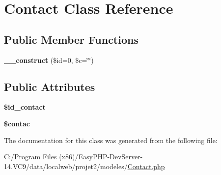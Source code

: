 \hypertarget{class_contact}{}\section{Contact Class Reference}
\label{class_contact}
\subsection*{Public Member Functions}
\begin{DoxyCompactItemize}
\item 
\mbox{\label{class_contact_a3c5a2b70d09ac36be451b4d5d6027810}} 
{\bfseries \+\_\+\+\_\+construct} (\$id=0, \$c=\char`\"{}\char`\"{})
\end{DoxyCompactItemize}
\subsection*{Public Attributes}
\begin{DoxyCompactItemize}
\item 
\mbox{\label{class_contact_a9fbfc98fad7d32a96af92c9b6cfcd5f0}} 
{\bfseries \$id\+\_\+contact}
\item 
\mbox{\label{class_contact_a0af93524e31b42ae5b1f3383161b14d8}} 
{\bfseries \$contac}
\end{DoxyCompactItemize}


The documentation for this class was generated from the following file\+:\begin{DoxyCompactItemize}
\item 
C\+:/\+Program Files (x86)/\+Easy\+P\+H\+P-\/\+Dev\+Server-\/14.\+V\+C9/data/localweb/projet2/modeles/\hyperlink{_contact_8php}{Contact.\+php}\end{DoxyCompactItemize}

